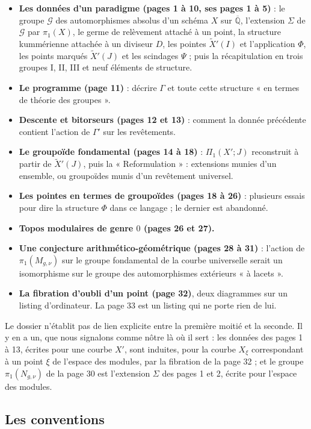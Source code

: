 \documentclass[11pt,a4paper]{article}
\begin{document}
\begin{itemize}
\item \textbf{Les données d'un paradigme (pages 1 à 10, ses pages 1 à 5)} :
le groupe $\mathcal{G}$ des automorphismes absolus d'un schéma $X$ sur
$\overline{\mathbb{Q}}$, l'extension $\Sigma$ de $\mathcal{G}$ par
$\pi_1(X)$, le germe de relèvement attaché à un point, la structure
kummérienne attachée à un diviseur $D$, les pointes $\widetilde X'(I)$ et
l'application $\Phi$, les points marqués $\widetilde X'(J)$ et les scindages
$\Psi$ ; puis la récapitulation en trois groupes I, II, III et neuf éléments
de structure.
\item \textbf{Le programme (page 11)} : décrire $\Gamma$ et toute cette
structure « en termes de théorie des groupes ».
\item \textbf{Descente et bitorseurs (pages 12 et 13)} : comment la donnée
précédente contient l'action de $\Gamma'$ sur les revêtements.
\item \textbf{Le groupoïde fondamental (pages 14 à 18)} : $\Pi_1(X'; J)$
reconstruit à partir de $\widetilde X'(J)$, puis la « Reformulation » :
extensions munies d'un ensemble, ou groupoïdes munis d'un revêtement
universel.
\item \textbf{Les pointes en termes de groupoïdes (pages 18 à 26)} :
plusieurs essais pour dire la structure $\Phi$ dans ce langage ; le dernier
est abandonné.
\item \textbf{Topos modulaires de genre $0$ (pages 26 et 27).}
\item \textbf{Une conjecture arithmético-géométrique (pages 28 à 31)} :
l'action de $\pi_1(M_{g,\nu})$ sur le groupe fondamental de la courbe
universelle serait un isomorphisme sur le groupe des automorphismes
extérieurs « à lacets ».
\item \textbf{La fibration d'oubli d'un point (page 32)}, deux diagrammes
sur un listing d'ordinateur. La page 33 est un listing qui ne porte rien de
lui.
\end{itemize}

Le dossier n'établit pas de lien explicite entre la première moitié et la
seconde. Il y en a un, que nous signalons comme nôtre là où il sert : les
données des pages 1 à 13, écrites pour une courbe $X'$, sont induites, pour
la courbe $X_\xi$ correspondant à un point $\xi$ de l'espace des modules, par
la fibration de la page 32 ; et le groupe $\pi_1(N_{g,\nu})$ de la page 30 est
l'extension $\Sigma$ des pages 1 et 2, écrite pour l'espace des modules.

\subsection*{Les conventions}
\end{document}
